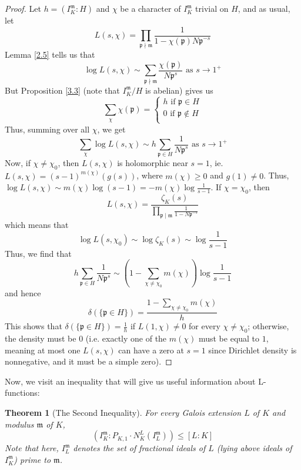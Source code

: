 \documentclass{article}
\theoremstyle{plain}
\newtheorem{thm}{Theorem}
\theoremstyle{definition}
\theoremstyle{remark}
\numberwithin{equation}{section}
\numberwithin{thm}{section}
\begin{document}
\begin{proof}
Let $h = (I_{K}^{\mathfrak{m}} : H)$ and $\chi$ be a character of $I_{K}^{\mathfrak{m}}$ trivial on $H$, and as usual, let $$L(s, \chi) = \prod_{\mathfrak{p} \nmid \mathfrak{m}} \frac{1}{1 - \chi(\mathfrak{p})N\mathfrak{p}^{-s}}$$ Lemma \ref{2.5} tells us that $$\log L(s, \chi) \sim \sum_{\mathfrak{p} \nmid \mathfrak{m}} \frac{\chi(\mathfrak{p})}{N\mathfrak{p}^{s}} \text{ as } s \to 1^{+}$$ But Proposition \ref{3.3} (note that $I_{K}^{\mathfrak{m}}/H$ is abelian) gives us $$\sum_{\chi} \chi(\mathfrak{p}) = 
\begin{cases}
h \text{ if } \mathfrak{p} \in H \\
0  \text { if } \mathfrak{p} \not\in H \\
\end{cases}$$ Thus, summing over all $\chi$, we get $$\sum_{\chi} \log L(s, \chi) \sim h \sum_{\mathfrak{p} \in H} \frac{1}{N\mathfrak{p}^{s}} \text{ as } s \to 1^{+}$$ Now, if $\chi \neq \chi_{0}$, then $L(s, \chi)$ is holomorphic near $s = 1$, ie. $L(s, \chi) = (s - 1)^{m(\chi)} (g(s))$, where $m(\chi) \geq 0$ and $g(1) \neq 0$. Thus, $\log L(s, \chi) \sim m(\chi)\log(s-1) = -m(\chi)\log\frac{1}{s - 1}$. If $\chi = \chi_{0}$, then $$L(s, \chi) = \frac{\zeta_K(s)}{\prod_{\mathfrak{p} \mid \mathfrak{m}} \frac{1}{1 - N\mathfrak{p}^{-s}}}$$ which means that $$\log L(s, \chi_{0}) \sim \log \zeta_K(s) \sim \log\frac{1}{s - 1}$$ Thus, we find that $$h \sum_{\mathfrak{p} \in H} \frac{1}{N\mathfrak{p}^{s}} \sim (1 - \sum_{\chi \neq \chi_{0}} m(\chi))\log\frac{1}{s-1}$$ and hence $$\delta(\{\mathfrak{p} \in H\}) = \frac{1 - \sum_{\chi \neq \chi_{0}} m(\chi)}{h}$$ This shows that $\delta(\{\mathfrak{p} \in H\}) = \frac{1}{h}$ if $L(1, \chi) \neq 0$ for every $\chi \neq \chi_{0}$; otherwise, the density must be $0$ (i.e. exactly one of the $m(\chi)$ must be equal to $1$, meaning at most one $L(s,\chi)$ can have a zero at $s = 1$ since Dirichlet density is nonnegative, and it must be a simple zero). 
\end{proof}

Now, we visit an inequality that will give us useful information about L-functions:

\begin{thm}[The Second Inequality]
For every Galois extension $L$ of $K$ and modulus $\mathfrak{m}$ of $K$, $$(I_{K}^{\mathfrak{m}} : P_{K, 1} \cdot N_{K}^{L}(I_{L}^{\mathfrak{m}})) \leq [L : K]$$ Note that here, $I_{L}^{\mathfrak{m}}$ denotes the set of fractional ideals of $L$ (lying above ideals of $I_{K}^{\mathfrak{m}}$) prime to $\mathfrak{m}$. 
\end{thm}
\end{document}
